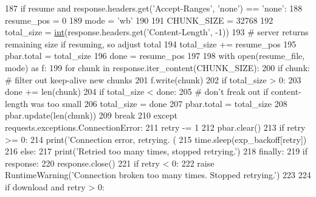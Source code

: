 \begin{DoxyCode}
{187                 \textcolor{keywordflow}{if} resume \textcolor{keywordflow}{and} response.headers.get(\textcolor{stringliteral}{'Accept-Ranges'}, \textcolor{stringliteral}{'none'}) == \textcolor{stringliteral}{'none'}:
188                     resume\_pos = 0
189                     mode = \textcolor{stringliteral}{'wb'}
190 
191                 CHUNK\_SIZE = 32768
192                 total\_size = \hyperlink{namespacelanguage__model_1_1eval__ppl_a7d12ee00479673c5c8d1f6d01faa272a}{int}(response.headers.get(\textcolor{stringliteral}{'Content-Length'}, -1))
193                 \textcolor{comment}{# server returns remaining size if resuming, so adjust total}
194                 total\_size += resume\_pos
195                 pbar.total = total\_size
196                 done = resume\_pos
197 
198                 with open(resume\_file, mode) \textcolor{keyword}{as} f:
199                     \textcolor{keywordflow}{for} chunk \textcolor{keywordflow}{in} response.iter\_content(CHUNK\_SIZE):
200                         \textcolor{keywordflow}{if} chunk:  \textcolor{comment}{# filter out keep-alive new chunks}
201                             f.write(chunk)
202                         \textcolor{keywordflow}{if} total\_size > 0:
203                             done += len(chunk)
204                             \textcolor{keywordflow}{if} total\_size < done:
205                                 \textcolor{comment}{# don't freak out if content-length was too small}
206                                 total\_size = done
207                                 pbar.total = total\_size
208                             pbar.update(len(chunk))
209                     \textcolor{keywordflow}{break}
210             \textcolor{keywordflow}{except} requests.exceptions.ConnectionError:
211                 retry -= 1
212                 pbar.clear()
213                 \textcolor{keywordflow}{if} retry >= 0:
214                     print(\textcolor{stringliteral}{'Connection error, retrying. (%
215                     time.sleep(exp\_backoff[retry])
216                 \textcolor{keywordflow}{else}:
217                     print(\textcolor{stringliteral}{'Retried too many times, stopped retrying.'})
218             \textcolor{keywordflow}{finally}:
219                 \textcolor{keywordflow}{if} response:
220                     response.close()
221     \textcolor{keywordflow}{if} retry < 0:
222         \textcolor{keywordflow}{raise} RuntimeWarning(\textcolor{stringliteral}{'Connection broken too many times. Stopped retrying.'})
223 
224     \textcolor{keywordflow}{if} download \textcolor{keywordflow}{and} retry > 0:
}}
\end{DoxyCode}
